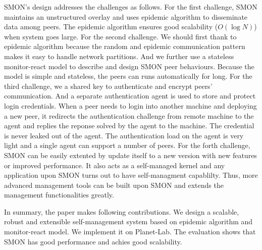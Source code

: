 SMON's design addresses the challenges as follows. For the
first challenge, SMON maintains an unstructured overlay and
uses epidemic algorithm to disseminate data among peers. The
epidemic algorithm ensures good scalability ($O(\log N)$)
when system goes large. For the second challenge. We should
first thank to epidemic algorithm because the random and
epidemic communication pattern makes it easy to handle
network partitions. And we further use a stateless
monitor-react model to describe and design SMON peer
behaviours. Because the model is simple and stateless, the
peers can runs automatically for long. For the third
challenge, we a shared key to authenticate and encrypt
peers' communication. And a separate authentication agent is
used to store and protect login credentials. When a peer
needs to login into another machine and deploying a new
peer, it redirects the authentication challenge from remote
machine to the agent and replies the reponse solved by the
agent to the machine. The credential is never leaked out of
the agent. The authentication load on the agent is very
light and a single agent can support a number of peers. For
the forth challenge, SMON can be easily extented by update
itself to a new version with new features or improved
performance. It also acts as a self-managed kernel and any
application upon SMON turns out to have self-managment
capablilty. Thus, more advanced management tools can be
built upon SMON and extends the management functionalities
greatly.



In summary, the paper makes following contributions.
We design a scalable, robust and extensible self-management
system based on epidemic algorithm and monitor-react model.
We implement it on Planet-Lab. The evaluation shows that
SMON has good performance and achies good scalability.

